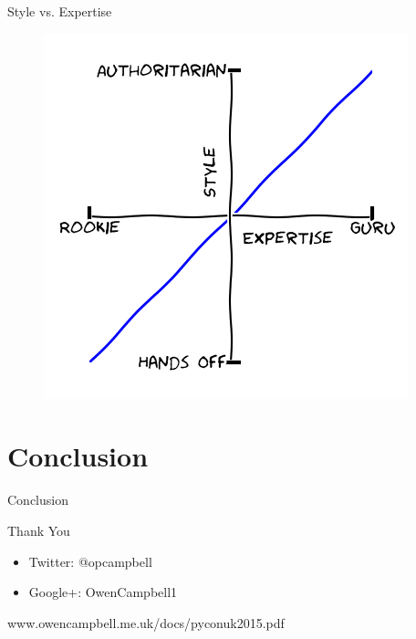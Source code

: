 \documentclass[14pt]{beamer}
\begin{document}
    \begin{frame}{Style vs. Expertise}
      \begin{figure}
          \includegraphics[scale=0.8]{images/style}
        \end{figure}
    \end{frame}

  \section{Conclusion}

    \begin{frame}{Conclusion}
    \end{frame}

    \begin{frame}{Thank You}
      \begin{itemize}
        \item Twitter: @opcampbell
        \item Google+: OwenCampbell1
      \end{itemize}
      www.owencampbell.me.uk/docs/pyconuk2015.pdf
    \end{frame}
\end{document}
